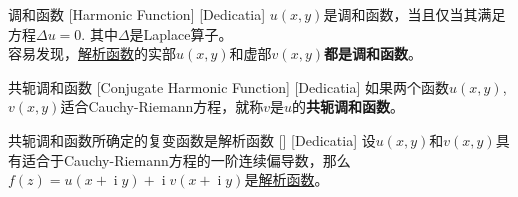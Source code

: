 \documentclass[UTF8]{ctexart}
\DeclareMathOperator{\ii}{\mathrm{i}}
\newcommand{\AnalyticalFunction}{\hyperref[dfn:AnalyticalFunction]{解析函数}}
\begin{document}
\begin{dfn}
    [UUID]
    {调和函数}
    [Harmonic Function]
    [Dedicatia]
    $u(x,y)$是调和函数，当且仅当其满足方程$\Delta u=0$. 其中$\Delta$是Laplace算子。\\
    容易发现，\AnalyticalFunction 的实部$u(x,y)$和虚部$v(x,y)$\textbf{都是调和函数}。
\end{dfn}
\begin{dfn}
    [UUID]
    {共轭调和函数}
    [Conjugate Harmonic Function]
    [Dedicatia]
    如果两个函数$u(x,y)$, $v(x,y)$适合Cauchy-Riemann方程，就称$v$是$u$的\textbf{共轭调和函数}。
\end{dfn}
\begin{thm}
    [UUID]
    {共轭调和函数所确定的复变函数是解析函数}
    []
    [Dedicatia]
    设$u(x,y)$和$v(x,y)$具有适合于Cauchy-Riemann方程的一阶连续偏导数，那么$f(z)=u(x+\ii y)+\ii v(x+\ii y)$是\AnalyticalFunction 。
\end{thm}
\end{document}
